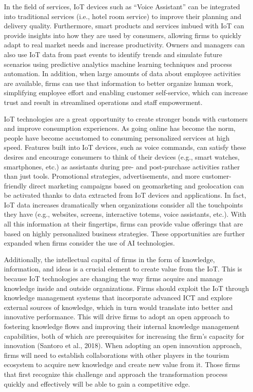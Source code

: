 \documentclass[
  letterpaper,
  DIV=11,
  numbers=noendperiod]{scrreprt}
\begin{document}
In the field of services, IoT devices such as ``Voice Assistant'' can be
integrated into traditional services (i.e., hotel room service) to
improve their planning and delivery quality. Furthermore, smart products
and services imbued with IoT can provide insights into how they are used
by consumers, allowing firms to quickly adapt to real market needs and
increase productivity. Owners and managers can also use IoT data from
past events to identify trends and simulate future scenarios using
predictive analytics machine learning techniques and process automation.
In addition, when large amounts of data about employee activities are
available, firms can use that information to better organize human work,
simplifying employee effort and enabling customer self-service, which
can increase trust and result in streamlined operations and staff
empowerment.

IoT technologies are a great opportunity to create stronger bonds with
customers and improve consumption experiences. As going online has
become the norm, people have become accustomed to consuming personalized
services at high speed. Features built into IoT devices, such as voice
commands, can satisfy these desires and encourage consumers to think of
their devices (e.g., smart watches, smartphones, etc.) as assistants
during pre- and post-purchase activities rather than just tools.
Promotional strategies, advertisements, and more customer-friendly
direct marketing campaigns based on geomarketing and geolocation can be
activated thanks to data extracted from IoT devices and applications. In
fact, IoT data increases dramatically when organizations consider all
the touchpoints they have (e.g., websites, screens, interactive totems,
voice assistants, etc.). With all this information at their fingertips,
firms can provide value offerings that are based on highly personalized
business strategies. These opportunities are further expanded when firms
consider the use of AI technologies.

Additionally, the intellectual capital of firms in the form of
knowledge, information, and ideas is a crucial element to create value
from the IoT. This is because IoT technologies are changing the way
firms acquire and manage knowledge inside and outside organizations.
Firms should exploit the IoT through knowledge management systems that
incorporate advanced ICT and explore external sources of knowledge,
which in turn would translate into better and innovative performance.
This will drive firms to adopt an open approach to fostering knowledge
flows and improving their internal knowledge management capabilities,
both of which are prerequisites for increasing the firm's capacity for
innovation (Santoro et al., 2018). When adopting an open innovation
approach, firms will need to establish collaborations with other players
in the tourism ecosystem to acquire new knowledge and create new value
from it. Those firms that first recognize this challenge and approach
the transformation process quickly and effectively will be able to gain
a competitive edge.
\end{document}
